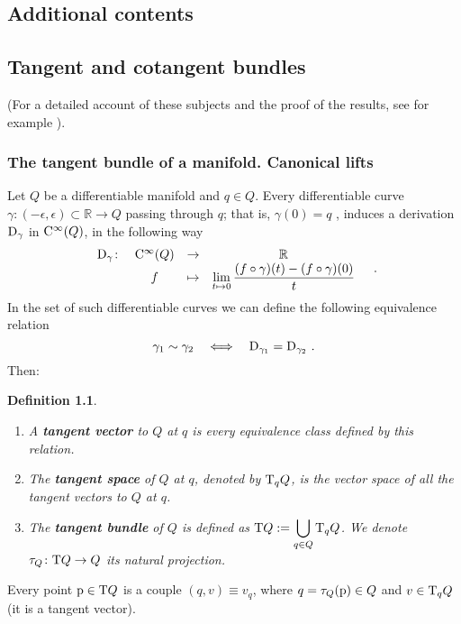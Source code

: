 \documentclass[12pt]{report}
\newtheorem{definition}[teor]{Definition}
\def\ben{\begin{enumerate}}
\def\een{\end{enumerate}}
\def\dst{\displaystyle}
\def\Real{\mathbb{R}}
\def\Tan{{\rm T}}
\def\Cinfty{{\rm C}^\infty}
\begin{document}


\begin{appendix}
\chapter{Additional contents}

\section{Tangent and cotangent bundles}
\label{sec:tangentb}

(For a detailed account of these subjects and the proof of the results, see for example 
\cite{Con2001,KN-96,Lee2013,PmQ-69,St-64}).


\subsection{The tangent bundle of a manifold. Canonical lifts}
\label{canliftq}

Let $Q$ be a differentiable manifold and  $q\in Q$.
Every differentiable curve
$\gamma\colon (-\epsilon ,\epsilon )\subset \Real \to Q$
passing through $q$; that is, 
$\gamma (0)=q$ ,
induces a derivation ${\rm D}_\gamma$ in $\Cinfty (Q)$,
in the following way
$$
\begin{array}{cccc}
{\rm D}_\gamma \colon & \Cinfty (Q) & \to & \Real
\\
& f & \mapsto &\displaystyle \lim_{t \mapsto 0}\frac{(f\circ\gamma )(t)-(f\circ\gamma )(0)}{t}
\end{array} \quad .
$$
In the set of such differentiable curves we can define the following equivalence relation
$$
\gamma_1 \sim \gamma_2 \quad \Longleftrightarrow
\quad
{\rm D}_{\gamma_1}={\rm D}_{\gamma_2} \ .
$$
Then:
\begin{definition}
\ben
\item
A \textbf{tangent vector} to $Q$ at $q$
is every equivalence class defined  by this relation.
\item
The \textbf{tangent space} of $Q$ at $q$,
denoted by $\Tan_qQ$, is the vector space of all the tangent vectors
to $Q$ at $q$.
\item
The \textbf{tangent bundle} of $Q$ is defined as
 \(\dst \Tan Q := \bigcup_{q \in Q}\Tan_qQ\).
We denote $\tau_Q \colon \Tan Q \to Q$ its natural projection.
\een
\end{definition}

Every point ${\rm p}\in\Tan Q$ is a couple
$(q,v)\equiv v_q$, where $q=\tau_Q({\rm p})\in Q$
and $v\in\Tan_qQ$ (it is a tangent vector).


\end{appendix}
\end{document}
